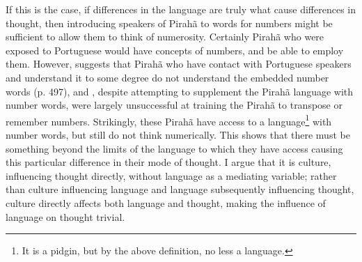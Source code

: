 \documentclass[man,12pt,natbib]{apa6}
\begin{document}
If this is the case, if differences in the language are truly what cause
differences in thought, then introducing speakers of Pirahã to words for
numbers might be sufficient to allow them to think of numerosity. Certainly
Pirah\~{a} who were exposed to Portuguese would have concepts of numbers, and
be able to employ them. However, \citet{Gordon04} suggests that Pirah\~{a} who
have contact with Portuguese speakers and understand it to some degree do not
understand the embedded number words (p. 497), and \citet{Everett12}, despite
attempting to supplement the Pirah\~{a} language with number words, were
largely unsuccessful at training the Pirah\~{a} to transpose or remember
numbers. 
Strikingly, these Pirah\~{a} have access to a language\footnote{It is a pidgin,
but by the above definition, no less a language.} with number words, but still
do not think numerically. 
This shows that there must be something beyond the limits of the language to
which they have access causing this particular difference in their mode of
thought. I argue that it is culture, influencing thought directly, without
language as a mediating variable; rather than culture influencing language and
language subsequently influencing thought, culture directly affects both
language and thought, making the influence of language on thought trivial.
\end{document}
